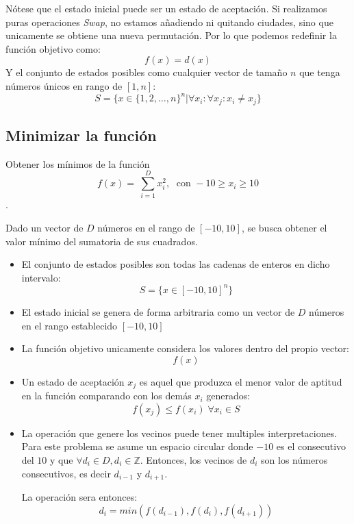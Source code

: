 \documentclass[12pt,twoside]{article}
\begin{document}
	
	
	Nótese que el estado inicial puede ser un estado de aceptación. Si realizamos puras operaciones \textit{Swap}, no estamos añadiendo ni quitando ciudades, sino que unicamente se obtiene una nueva permutación. Por lo que podemos redefinir la función objetivo como: \[ f(x) = d(x) \] Y el conjunto de estados posibles como cualquier vector de tamaño $n$ que tenga números únicos en rango de $[1,n]$: \[ S = \{ x \in \{1, 2, \dots, n  \}^n | \forall x_i \colon \forall x_j \colon x_i \neq x_j \}\]
	
	\subsection{Minimizar la función}
	
	Obtener los mínimos de la función \[ f(x) = \ \sum_{i = 1}^{D} x_i^2, \; \text{ con } -10 \geq x_i \geq 10 \].
	
	Dado un vector de $D$ números en el rango de $[-10, 10]$, se busca obtener el valor mínimo del sumatoria  de sus cuadrados.
	
	\begin{itemize}
		\item El conjunto de estados posibles son todas las cadenas de enteros en dicho intervalo: \[ S = \{ x \in [-10, 10]^n \} \]
		
		\item El estado inicial se genera de forma arbitraria como un vector de $D$ números en el rango establecido $[-10, 10]$
		
		\item La función objetivo unicamente considera los valores dentro del propio vector: \[f(x) \]
		
		\item Un estado de aceptación $x_j$ es aquel que produzca el menor valor de aptitud en la función comparando con los demás $x_i$ generados: \[ f(x_j) \leq f(x_i) \; \forall x_i \in S\] 
	
		\item La operación que genere los vecinos puede tener multiples interpretaciones. Para este problema se asume un espacio circular donde $-10$ es el consecutivo del $10$ y que $\forall d_i \in D, d_i \in \mathbb{Z}$.  Entonces, los vecinos de $d_i$ son los números consecutivos, es decir $d_{i-1}$ y $d_{i+1}$.
	
		La operación sera entonces:
		\[ d_i = min(f(d_{i-1}), f(d_i), f(d_{i+1})) \]	
	\end{itemize}
\end{document}
